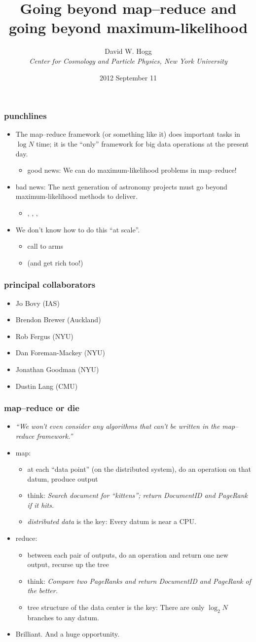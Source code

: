 \documentclass[pdftex]{beamer}
\title{Going beyond map--reduce and \\ going beyond maximum-likelihood}
\author[David W. Hogg (NYU)]{David W. Hogg \\
  \textsl{\small Center for Cosmology and Particle Physics,
                 New York University}}
\date{2012 September 11}
\newcommand{\conclusion}{
\begin{frame}
  \frametitle{punchlines}
  \begin{itemize}
  \item The map--reduce framework (or something like it) does
    important tasks in $\log N$ time; it is the ``only'' framework
    for big data operations at the present day.
    \begin{itemize}
    \item good news: We can do maximum-likelihood problems in map--reduce!
    \end{itemize}
  \item bad news:  The next generation of astronomy projects must go beyond
    maximum-likelihood methods to deliver.
    \begin{itemize}
    \item \gaia, \lsst, \euclid, \etc
    \end{itemize}
  \item We don't know how to do this ``at scale''.
    \begin{itemize}
    \item call to arms
    \item (and get rich too!)
    \end{itemize}
  \end{itemize}
\end{frame}
}
\begin{document}
\begin{frame}
  \titlepage
\end{frame}

\conclusion

\begin{frame}
  \frametitle{principal collaborators}
  \begin{itemize}
  \item Jo Bovy (IAS)
  \item Brendon Brewer (Auckland)
  \item Rob Fergus (NYU)
  \item Dan Foreman-Mackey (NYU)
  \item Jonathan Goodman (NYU)
  \item Dustin Lang (CMU)
  \end{itemize}
\end{frame}

\begin{frame}
  \frametitle{map--reduce or die}
  \begin{itemize}
  \item \emph{``We won't even consider any algorithms that can't be
    written in the map--reduce framework.''}
  \item map:
    \begin{itemize}
    \item at each ``data point'' (on the distributed system), do an
      operation on that datum, produce output
    \item think: \emph{Search document for ``kittens''; return
      DocumentID and PageRank if it hits.}
    \item \emph{distributed data} is the key: Every datum is near a
      CPU.
    \end{itemize}
  \item reduce:
    \begin{itemize}
    \item between each pair of outputs, do an operation and return one
      new output, recurse up the tree
    \item think: \emph{Compare two PageRanks and return DocumentID and
      PageRank of the better.}
    \item tree structure of the data center is the key: There are only
      $\log_2 N$ branches to any datum.
    \end{itemize}
  \item Brilliant.  And a huge opportunity.
  \end{itemize}
\end{frame}
\end{document}
